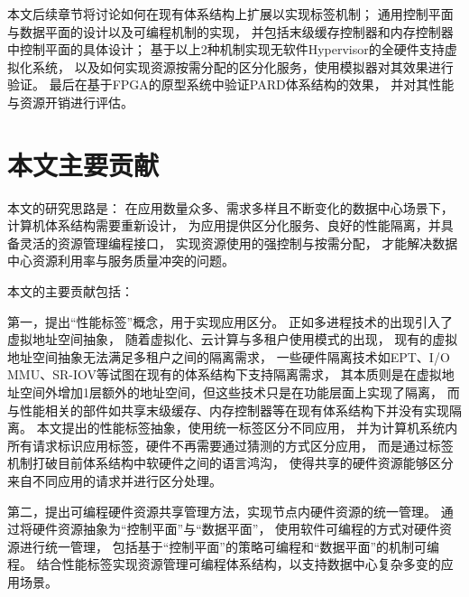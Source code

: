 本文后续章节将讨论如何在现有体系结构上扩展以实现标签机制；
通用控制平面与数据平面的设计以及可编程机制的实现，
并包括末级缓存控制器和内存控制器中控制平面的具体设计；
基于以上2种机制实现无软件Hypervisor的全硬件支持虚拟化系统，
以及如何实现资源按需分配的区分化服务，使用模拟器对其效果进行验证。
最后在基于FPGA的原型系统中验证PARD体系结构的效果，
并对其性能与资源开销进行评估。


\section{本文主要贡献}

本文的研究思路是：
在应用数量众多、需求多样且不断变化的数据中心场景下，计算机体系结构需要重新设计，
为应用提供区分化服务、良好的性能隔离，并具备灵活的资源管理编程接口，
实现资源使用的强控制与按需分配，
才能解决数据中心资源利用率与服务质量冲突的问题。

本文的主要贡献包括：

第一，提出``性能标签''概念，用于实现应用区分。
正如多进程技术的出现引入了虚拟地址空间抽象，
随着虚拟化、云计算与多租户使用模式的出现，
现有的虚拟地址空间抽象无法满足多租户之间的隔离需求，
一些硬件隔离技术如EPT、I/O MMU、SR-IOV等试图在现有的体系结构下支持隔离需求，
其本质则是在虚拟地址空间外增加1层额外的地址空间，但这些技术只是在功能层面上实现了隔离，
而与性能相关的部件如共享末级缓存、内存控制器等在现有体系结构下并没有实现隔离。
本文提出的性能标签抽象，使用统一标签区分不同应用，
并为计算机系统内所有请求标识应用标签，硬件不再需要通过猜测的方式区分应用，
而是通过标签机制打破目前体系结构中软硬件之间的语言鸿沟，
使得共享的硬件资源能够区分来自不同应用的请求并进行区分处理。

第二，提出可编程硬件资源共享管理方法，实现节点内硬件资源的统一管理。
通过将硬件资源抽象为``控制平面''与``数据平面''，
使用软件可编程的方式对硬件资源进行统一管理，
包括基于``控制平面''的策略可编程和``数据平面''的机制可编程。
结合性能标签实现资源管理可编程体系结构，以支持数据中心复杂多变的应用场景。


